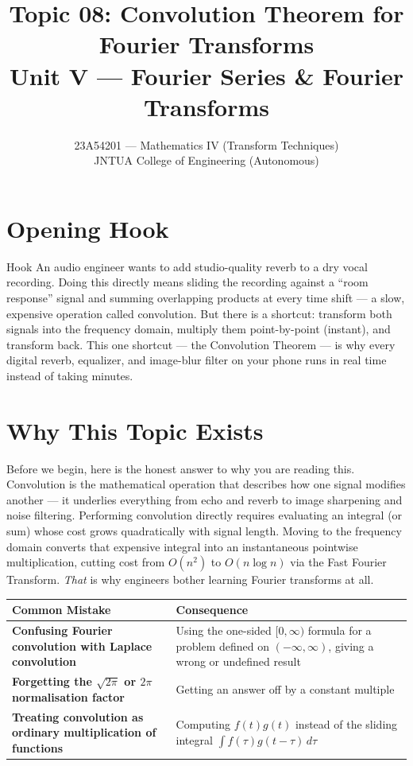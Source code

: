 \documentclass[12pt,a4paper]{article}
\title{Topic 08: Convolution Theorem for Fourier Transforms \\
       \large Unit V --- Fourier Series \& Fourier Transforms}
\author{23A54201 --- Mathematics IV (Transform Techniques)\\
        JNTUA College of Engineering (Autonomous)}
\date{}
\begin{document}
\maketitle
\tableofcontents
\newpage

\section{Opening Hook}

\begin{curiositybox}{Hook}
An audio engineer wants to add studio-quality reverb to a dry vocal recording.
Doing this directly means sliding the recording against a ``room response'' signal
and summing overlapping products at every time shift --- a slow, expensive operation
called convolution. But there is a shortcut: transform both signals into the frequency
domain, multiply them point-by-point (instant), and transform back. This one shortcut
--- the Convolution Theorem --- is why every digital reverb, equalizer, and
image-blur filter on your phone runs in real time instead of taking minutes.
\end{curiositybox}

\section{Why This Topic Exists}

Before we begin, here is the honest answer to why you are reading this.
Convolution is the mathematical operation that describes how one signal modifies
another --- it underlies everything from echo and reverb to image sharpening and
noise filtering. Performing convolution directly requires evaluating an integral
(or sum) whose cost grows quadratically with signal length.
Moving to the frequency domain converts that expensive integral into an
instantaneous pointwise multiplication, cutting cost from $O(n^2)$ to $O(n\log n)$
via the Fast Fourier Transform. \emph{That} is why engineers bother learning Fourier
transforms at all.

\begin{center}
\begin{tabular}{>{\bfseries}p{6cm} p{8cm}}
\toprule
Common Mistake & Consequence \\
\midrule
Confusing Fourier convolution with Laplace convolution &
  Using the one-sided $[0,\infty)$ formula for a problem defined on $(-\infty,\infty)$,
  giving a wrong or undefined result \\[4pt]
Forgetting the $\sqrt{2\pi}$ or $2\pi$ normalisation factor &
  Getting an answer off by a constant multiple \\[4pt]
Treating convolution as ordinary multiplication of functions &
  Computing $f(t)g(t)$ instead of the sliding integral
  $\int f(\tau)g(t-\tau)\,d\tau$ \\
\bottomrule
\end{tabular}
\end{center}
\end{document}
